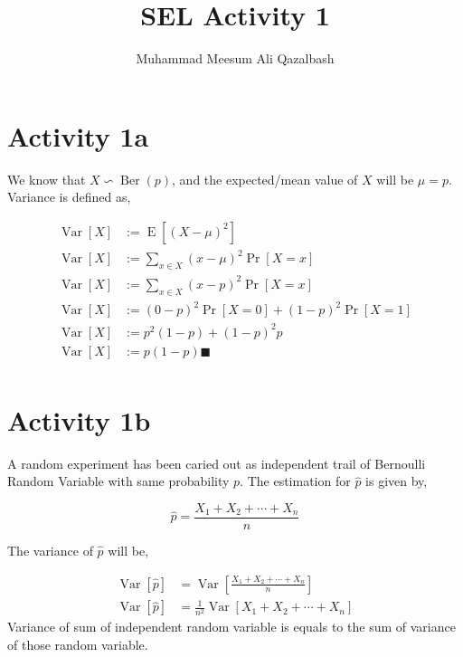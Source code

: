 \documentclass{article}
\title{SEL Activity 1}
\author{Muhammad Meesum Ali Qazalbash}
\theoremstyle{mytheoremstyle}
\theoremstyle{mytheoremstyle}
\theoremstyle{myproblemstyle}
\begin{document}
\maketitle

\section{Activity 1a}
We know that \(X\backsim \operatorname{Ber}(p)\), and the expected/mean value of \(X\) will be \(\mu=p\). Variance is defined as,

\begin{equation}
	\begin{split}
		\operatorname{Var}[X]&:=\operatorname{E}[(X-\mu)^2]\\
		\operatorname{Var}[X]&:=\sum_{x\in X}(x-\mu)^2\operatorname{Pr}[X=x]\\
		\operatorname{Var}[X]&:=\sum_{x\in X}(x-p)^2\operatorname{Pr}[X=x]\\
		\operatorname{Var}[X]&:=(0-p)^2\operatorname{Pr}[X=0]+(1-p)^2\operatorname{Pr}[X=1]\\
		\operatorname{Var}[X]&:=p^2(1-p)+(1-p)^2p\\
		\operatorname{Var}[X]&:=p(1-p)\blacksquare\\
	\end{split}
\end{equation}

\section{Activity 1b}

A random experiment has been caried out as independent trail of Bernoulli Random Variable with same probability \(p\). The estimation for \(\hat{p}\) is given by,

\[\hat{p}=\frac{X_1+X_2+\cdots+X_n}{n}\]

The variance of \(\hat{p}\) will be,

\begin{equation}
	\begin{split}
		\operatorname{Var}[\hat{p}]&=\operatorname{Var}\left[\frac{X_1+X_2+\cdots+X_n}{n}\right]\\
		\operatorname{Var}[\hat{p}]&=\frac{1}{n^2}\operatorname{Var}\left[X_1+X_2+\cdots+X_n\right]
	\end{split}
\end{equation}
Variance of sum of independent random variable is equals to the sum of variance of those random variable.
\end{document}
